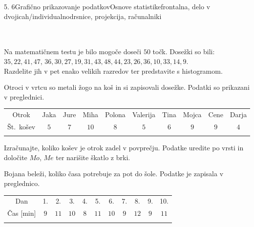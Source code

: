 \begin{priprava}{5. 6}{}{Grafično prikazovanje podatkov}{Osnove statistike}{frontalna, delo v dvojicah/individualno}{drsnice, projekcija, računalniki}
~\\~\\~






    \begin{naloga}
 
        Na matematičnem testu je bilo mogoče doseči $50$ točk. Dosežki so bili: 
        $35, 22, 41, 47$, $36, 30, 27, 19, 31, 43, 48, 44, 23, 26, 36, 10, 33, 14, 9$. \\
        Razdelite jih v pet enako velikih razredov ter predstavite s histogramom.
        
    \end{naloga}


    \begin{naloga}
     
     Otroci v vrtcu so metali žogo na koš in si zapisovali dosežke. Podatki so prikazani v preglednici. 

         \begin{table}[H]
             \centering
             \begin{tabular}{||c|c|c|c|c|c|c|c|c|c||} 
             \hhline{|t:==========:t|}
             \rowcolor[rgb]{0.843,0.718,0.718} 
             Otrok  & Jaka & Jure & Miha & Polona & Valerija & Tina & Mojca & Cene & Darja   \\ 
             \hhline{|:==========:|}
             Št.~košev & $5$ & $7$ & $10$ & $8$ & $5$ & $6$ & $9$ & $9$& $4$  \\ 
             \hhline{|b:==========:b|}
             \end{tabular}
         \end{table}

         Izračunajte, koliko košev je otrok zadel v povprečju. Podatke uredite po vrsti in določite $Mo$, $Me$ ter narišite škatlo z brki.

    \end{naloga}





\begin{naloga}
 
    Bojana beleži, koliko časa potrebuje za pot do šole. Podatke je zapisala v preglednico. 

     \begin{table}[H]
         \centering
         \begin{tabular}{||c|c|c|c|c|c|c|c|c|c|c||} 
         \hhline{|t:===========:t|}
         \rowcolor[rgb]{0.843,0.718,0.718} 
         Dan  & 1. & 2. & 3. & 4. & 5. & 6. & 7. & 8. & 9. & 10.   \\ 
         \hhline{|:===========:|}
         Čas [min] & $9$ & $11$ & $10$ & $8$ & $11$ & $10$ & $9$ & $12$& $9$ & $11$ \\ 
         \hhline{|b:===========:b|}
         \end{tabular}
     \end{table}


\end{naloga}
\end{priprava}
